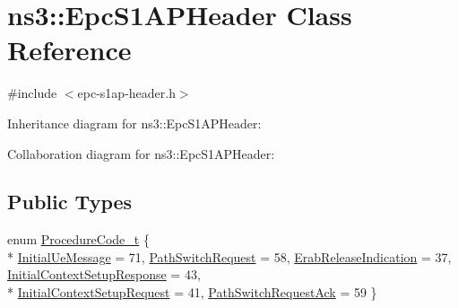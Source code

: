 \hypertarget{classns3_1_1EpcS1APHeader}{}\section{ns3\+:\+:Epc\+S1\+A\+P\+Header Class Reference}
\label{classns3_1_1EpcS1APHeader}


{\ttfamily \#include $<$epc-\/s1ap-\/header.\+h$>$}



Inheritance diagram for ns3\+:\+:Epc\+S1\+A\+P\+Header\+:


Collaboration diagram for ns3\+:\+:Epc\+S1\+A\+P\+Header\+:
\subsection*{Public Types}
\begin{DoxyCompactItemize}
\item 
enum \hyperlink{classns3_1_1EpcS1APHeader_aedd7ba8568bf04ce8960bd840712a63e}{Procedure\+Code\+\_\+t} \{ \\*
\hyperlink{classns3_1_1EpcS1APHeader_aedd7ba8568bf04ce8960bd840712a63eaf6e59a9d987f46fb18f5113370354521}{Initial\+Ue\+Message} = 71, 
\hyperlink{classns3_1_1EpcS1APHeader_aedd7ba8568bf04ce8960bd840712a63eaab42fb0bc4eaa2bd39ab5195f0d6a6d8}{Path\+Switch\+Request} = 58, 
\hyperlink{classns3_1_1EpcS1APHeader_aedd7ba8568bf04ce8960bd840712a63eacba9fcdd89b080f9511a1de3dea78cf0}{Erab\+Release\+Indication} = 37, 
\hyperlink{classns3_1_1EpcS1APHeader_aedd7ba8568bf04ce8960bd840712a63eaa7514c43bcf4967085e33f2258d754d0}{Initial\+Context\+Setup\+Response} = 43, 
\\*
\hyperlink{classns3_1_1EpcS1APHeader_aedd7ba8568bf04ce8960bd840712a63eaee7f11dc02c8f9c13cc21727512cb72f}{Initial\+Context\+Setup\+Request} = 41, 
\hyperlink{classns3_1_1EpcS1APHeader_aedd7ba8568bf04ce8960bd840712a63ea4c73b45629052b31f0636b3ba4b9d58f}{Path\+Switch\+Request\+Ack} = 59
 \}
\end{DoxyCompactItemize}

